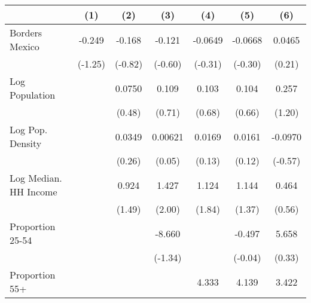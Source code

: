 {
\def\sym#1{\ifmmode^{#1}\else\(^{#1}\)\fi}
\begin{tabular}{l*{6}{c}}
\toprule
                    &\multicolumn{1}{c}{(1)}         &\multicolumn{1}{c}{(2)}         &\multicolumn{1}{c}{(3)}         &\multicolumn{1}{c}{(4)}         &\multicolumn{1}{c}{(5)}         &\multicolumn{1}{c}{(6)}         \\
\midrule
Borders Mexico      &      -0.249         &      -0.168         &      -0.121         &     -0.0649         &     -0.0668         &      0.0465         \\
                    &     (-1.25)         &     (-0.82)         &     (-0.60)         &     (-0.31)         &     (-0.30)         &      (0.21)         \\
\addlinespace
Log Population      &                     &      0.0750         &       0.109         &       0.103         &       0.104         &       0.257         \\
                    &                     &      (0.48)         &      (0.71)         &      (0.68)         &      (0.66)         &      (1.20)         \\
\addlinespace
Log Pop. Density    &                     &      0.0349         &     0.00621         &      0.0169         &      0.0161         &     -0.0970         \\
                    &                     &      (0.26)         &      (0.05)         &      (0.13)         &      (0.12)         &     (-0.57)         \\
\addlinespace
Log Median. HH Income&                     &       0.924         &       1.427         &       1.124         &       1.144         &       0.464         \\
                    &                     &      (1.49)         &      (2.00)         &      (1.84)         &      (1.37)         &      (0.56)         \\
\addlinespace
Proportion 25-54    &                     &                     &      -8.660         &                     &      -0.497         &       5.658         \\
                    &                     &                     &     (-1.34)         &                     &     (-0.04)         &      (0.33)         \\
\addlinespace
Proportion 55+      &                     &                     &                     &       4.333         &       4.139         &       3.422         \\

\end{tabular}}
